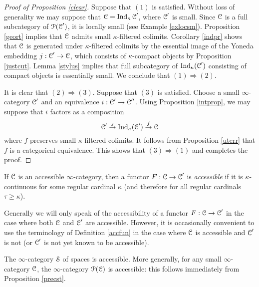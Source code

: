 \begin{proof}[Proof of Proposition \ref{clear}]
Suppose that $(1)$ is satisfied. Without loss of generality we may suppose that
$\operatorname{\mathcal{C}} = \operatorname{Ind}_{\kappa} \operatorname{\mathcal{C}}'$, where $\operatorname{\mathcal{C}}'$ is small. Since $\operatorname{\mathcal{C}}$ is a full subcategory of $\operatorname{\mathcal{P}}(\operatorname{\mathcal{C}}')$, it is locally small (see Example \ref{exlocsm}). Proposition \ref{geort}
implies that $\operatorname{\mathcal{C}}$ admits small $\kappa$-filtered colimits. Corollary \ref{indpr} shows that
$\operatorname{\mathcal{C}}$ is generated under $\kappa$-filtered colimits by the essential image of the Yoneda embedding $j: \operatorname{\mathcal{C}}' \rightarrow \operatorname{\mathcal{C}}$, which consists of $\kappa$-compact objects by Proposition \ref{justcut}. Lemma \ref{stylus} implies that full subcategory of $\operatorname{Ind}_{\kappa}(\operatorname{\mathcal{C}}')$ consisting of compact objects is essentially small. We conclude that $(1) \Rightarrow (2)$. 

It is clear that $(2) \Rightarrow (3)$. Suppose that $(3)$ is satisfied. Choose a small $\infty$-category $\operatorname{\mathcal{C}}'$ and an equivalence $i: \operatorname{\mathcal{C}}' \rightarrow \operatorname{\mathcal{C}}''$. Using Proposition \ref{intprop}, we may suppose that $i$ factors as a composition
$$ \operatorname{\mathcal{C}}' \stackrel{j}{\rightarrow} \operatorname{Ind}_{\kappa}(\operatorname{\mathcal{C}}') \stackrel{f}{\rightarrow} \operatorname{\mathcal{C}}$$
where $f$ preserves small $\kappa$-filtered colimits. It follows from Proposition \ref{uterr} that
$f$ is a categorical equivalence. This shows that $(3) \Rightarrow (1)$ and completes the proof.
\end{proof}

\begin{definition}\label{accfun}
If $\operatorname{\mathcal{C}}$ is an accessible $\infty$-category, then a functor
$F: \operatorname{\mathcal{C}} \rightarrow \operatorname{\mathcal{C}}'$ is {\it accessible} if it is $\kappa$-continuous for some regular cardinal $\kappa$ (and therefore for all regular cardinals $\tau \geq \kappa$).
\end{definition}

\begin{remark}
Generally we will only speak of the accessibility of a functor $F: \operatorname{\mathcal{C}} \rightarrow \operatorname{\mathcal{C}}'$
in the case where both $\operatorname{\mathcal{C}}$ and $\operatorname{\mathcal{C}}'$ are accessible. However, it is occasionally convenient to use the terminology of Definition \ref{accfun} in the case where $\operatorname{\mathcal{C}}$ is accessible and $\operatorname{\mathcal{C}}'$ is not (or $\operatorname{\mathcal{C}}'$ is not yet known to be accessible).
\end{remark}

\begin{example}\label{spacesareaccessible}
The $\infty$-category $\operatorname{\mathcal{S}}$ of spaces is accessible. More generally, for any small
$\infty$-category $\operatorname{\mathcal{C}}$, the $\infty$-category $\operatorname{\mathcal{P}}(\operatorname{\mathcal{C}})$ is accessible: this follows immediately from Proposition \ref{precst}.
\end{example}

